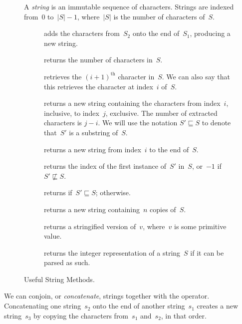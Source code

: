 \begin{figure}[tp]
    \small
    \begin{tcolorbox}[title=String Class]
      A \emph{string} is an immutable sequence of characters. Strings are indexed from~$0$ to~$|S|-1$, where~$|S|$ is the number of characters of~$S$.
      \vspace{2ex}
    \begin{description}
      \item[] adds the characters from~$S_2$ onto the end of~$S_1$, producing a new string.
      \item[] returns the number of characters in~$S$.
      \item[] retrieves the $(i + 1)^\text{th}$ character in~$S$. We can also say that this retrieves the character at index~$i$ of~$S$.
      \item[] returns a new string containing the characters from index~$i$, inclusive, to index~$j$, exclusive. The number of extracted characters is $j - i$. We will use the notation $S' \sqsubseteq S$ to denote that~$S'$ is a substring of~$S$.
      \item[] returns a new string from index~$i$ to the end of~$S$.
      \item[] returns the index of the first instance of~$S'$ in~$S$, or~$-1$ if $S' \not\sqsubseteq S$.
      \item[] returns  if~$S' \sqsubseteq S$;  otherwise.
      \item[] returns a new string containing~$n$ copies of~$S$.
      \item[] returns a stringified version of~$v$, where~$v$ is some primitive value.
      \item[] returns the integer representation of a string~$S$ if it can be parsed as such.
    \end{description}
  \end{tcolorbox}
    \caption{Useful String Methods.}
    \label{fig:strings}
  \end{figure}

We can conjoin, or \emph{concatenate}, strings together with the \ttt{+} operator. 
Concatenating one string~$s_2$ onto the end of another string~$s_1$ creates a new string~$s_3$ by copying the characters from~$s_1$ and~$s_2$, in that order. 

